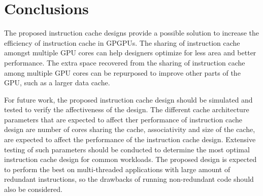 \section{Conclusions}

The proposed instruction cache designs provide a possible solution to increase the efficiency of instruction cache in GPGPUs. The sharing of instruction cache amongst multiple GPU cores can help designers optimize for less area and better performance. The extra space recovered from the sharing of instruction cache among multiple GPU cores can be repurposed to improve other parts of the GPU, such as a larger data cache.

For future work, the proposed instruction cache design should be simulated and tested to verify the affectiveness of the design. The different cache architecture parameters that are expected to affect ther performance of instruction cache design are number of cores sharing the cache, associativity and size of the cache, are expected to affect the performance of the instruction cache design. Extensive testing of such parameters should be conducted to determine the most optimal instruction cache design for common workloads. The proposed design is expected to perform the best on multi-threaded applications with large amount of redundant instructions, so the drawbacks of running non-redundant code should also be considered.
